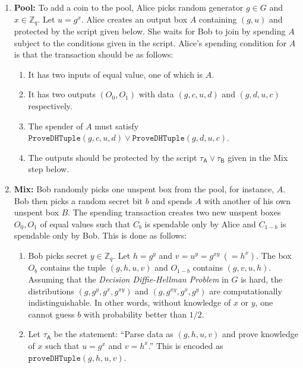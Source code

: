 \documentclass[11pt]{article}
\begin{document}
\begin{enumerate}
	\item \textbf{Pool:} To add a coin to the pool, Alice picks random generator $g\in G$ and $x\in \mathbb{Z}_q$. Let $u = g^{x}$. Alice creates an output box $A$ containing $(g, u)$ and protected by the script given below. She waits for Bob to join by spending $A$ subject to the conditions given in the script. 
Alice's spending condition for $A$ is that the transaction should be as follows: 
	
	\begin{enumerate}
		\item It has two inputs of equal value, one of which is $A$. %
		\item It has two outputs $(O_0, O_1)$ with data $(g, c, u, d)$ and $(g, d, u, c)$ respectively.
		\item The spender of $A$ must satisfy $\texttt{ProveDHTuple}(g, c, u, d)\lor \texttt{ProveDHTuple}(g, d, u, c)$.
		\item The outputs should be protected by the script $\tau_\textsf{A} \lor \tau_\textsf{B}$ given in the Mix step below.
	\end{enumerate}
	
	
	\item \textbf{Mix:} Bob randomly picks one unspent box from the pool, for instance, $A$. Bob then picks a random secret bit $b$ and spends $A$ with another of his own unspent box $B$. The spending transaction creates two new unspent boxes $O_0, O_1$ of equal values such that $C_b$ is spendable only by Alice and $C_{1-b}$ is spendable only by Bob. This is done as follows:
	
	\begin{enumerate}
		
		\item Bob picks secret $y\in \mathbb{Z}_q$. Let $h = {g}^{y}$ and $v = {u}^{y} = {g}^{xy}~(={h}^{x})$.  %
		The box $O_b$ contains the tuple $(g, h, u, v)$ and $O_{1-b}$ contains $(g, v, u, h)$. Assuming that the {\em Decision Diffie-Hellman Problem} in $G$ is hard, the distributions $(g, {g}^{y}, {g}^{x}, {g}^{xy})$ and 
		$(g, {g}^{xy}, {g}^{x}, {g}^{y})$ are computationally indistinguishable. In other words, without knowledge of $x$ or $y$, one cannot guess $b$ with probability better than $1/2$.
		\item  Let 
		$\tau_\textsf{A}$ be the statement: ``Parse data as $(g, h, u, v)$ and
		prove knowledge of $x$ such that $u = {g}^{x}$ and ${v} = {h}^{x}$.'' This is encoded as $\texttt{proveDHTuple}(g, h, u, v)$.
		

\end{enumerate}
\end{enumerate}
\end{document}
